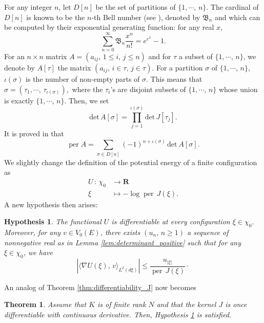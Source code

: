 \documentclass[11pt,a4paper]{amsart}
\newtheorem{Theorem}{Theorem}
\newtheorem{hyp}{Hypothesis}
\begin{document}
For any integer $n$, let $D[n]$ be the set of partitions of
$\{1,\cdots,\, n\}.$ The cardinal of $D[n]$ is known to be the $n$-th
Bell number (see \cite{MR1434477}), denoted by ${{\mathfrak B}}_n$ and which can
be computed by their exponential generating function: for any real
$x$,
\begin{equation}
  \label{eq:23}
  \sum_{n=0}^\infty {{\mathfrak B}}_n \frac{x^n}{n!}=e^{e^x}-1.
\end{equation}
For an $n\times n$ matrix $A=(a_{ij}, \, 1\le i,\, j\le n)$ and for
$\tau$ a subset of $\{1,\cdots,\,n \}$, we denote by $A[\tau]$ the
matrix $(a_{ij},\, i\in \tau,\, j\in \tau)$. For a partition $\sigma$
of $\{1,\cdots,\, n\}$, $\iota(\sigma)$ is the number of non-empty
parts of $\sigma$. This means that $\sigma=(\tau_1,\cdots,\,
\tau_{\iota(\sigma)}),$ where the $\tau_i$'s are disjoint subsets of
$\{1,\cdots,\, n\}$ whose union is exactly $\{1,\cdots,\, n\}$. Then,
we set
\begin{equation*}
  {{\text{det}}}\, A[\sigma]= \prod_{j=1}^{\iota(\sigma)} {{\text{det}}} \, J[\tau_j].
\end{equation*}
It is proved in \cite[Corollary 1.7]{MR1433237} that
\begin{equation}\label{eq:24}
  {\operatorname{per}} A=\sum_{\sigma\in D[n]} (-1)^{n+\iota(\sigma)}\, {{\text{det}}}\ A[\sigma].
\end{equation}
We slightly change the definition of the potential energy of a finite
configuration as
\begin{align*}
  U\, :\, \chi_0 & \longrightarrow {{\mathbf R}}\\
  \xi & \longmapsto -\log {\operatorname{per}}\, J(\xi).
\end{align*}
A new hypothesis then arises:
\begin{hyp}
  \label{hyp:U_differentiable}
  The functional $U$ is differentiable at every configuration $\xi\in
  \chi_0.$ Moreover, for any $v\in V_0(E)$, there exists $(u_n,\, n\ge
  1)$ a sequence of nonnegative real as in Lemma
  \ref{lem:determinant_positive} such that for any $\xi\in \chi_0$, we
  have
  \begin{equation}\label{eq:9}
    \left| \langle \nabla U(\xi),\, v\rangle_{L^2(d\xi)}\right|\le
    \frac{u_{|\xi|}}{{\operatorname{per}}\, J(\xi)}\cdotp
  \end{equation}
\end{hyp}
An analog of Theorem \ref{thm:differentiability_J} now becomes
\begin{Theorem}
  \label{thm:differentiability_J_per}
  Assume that $K$ is of finite rank $N$ and that the kernel $J$ is
  once differentiable with continuous derivative. Then, Hypothesis
  \ref{hyp:U_differentiable} is satisfied.
\end{Theorem}
\end{document}
